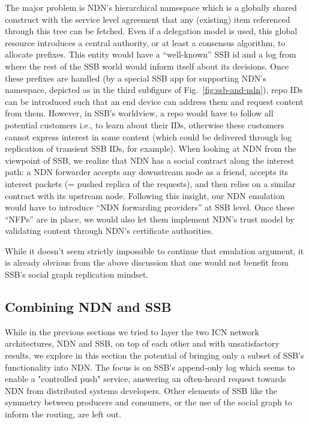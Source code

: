 \documentclass[9pt,sigconf]{acmart}
\begin{document}
The major problem is NDN's hierarchical namespace which is a globally
shared construct with the service level agreement that any (existing)
item referenced through this tree can be fetched.  Even if a
delegation model is used, this global resource introduces a central
authority, or at least a consensus algorithm, to allocate
prefixes. This entity would have a ``well-known'' SSB id and a log
from where the rest of the SSB world would inform itself about its
decisions. Once these prefixes are handled (by a special SSB app for
supporting NDN's namespace, depicted as  in the third subfigure of Fig.~\ref{fig:ssb-and-ndn}), repo IDs
can be introduced such that an end device can address them and request
content from them. However, in SSB's worldview, a repo would have to
follow all potential customers i.e., to learn about their IDs,
otherwise these customers cannot express interest in some content
(which could be delivered through log replication of transient SSB
IDs, for example). When looking at NDN from the viewpoint of SSB,
 we realize that NDN has a social contract along the interest path:
 a NDN forwarder accepts any downstream node as a friend, accepts its interest packets (= pushed
replica of the requests), and then relies on a similar contract with
its upstream node. Following this insight, our NDN emulation would
have to introduce ``NDN forwarding providers'' at SSB level. Once
these ``NFPs'' are in place, we would also let them implement
NDN's trust model by validating content through NDN's certificate
authorities.

While it doesn't seem strictly impossible to continue that emulation
argument, it is already obvious from the above discussion that one
would not benefit from SSB's social graph replication mindset.


\subsection{Combining NDN and SSB}
\label{ssect:combining}


While in the previous sections we tried to layer the two ICN network
architectures, NDN and SSB, on top of each other and with
unsatisfactory results, we explore in this section the potential of
bringing only a subset of SSB's functionality into NDN. The focus is
on SSB's append-only log which seems to enable a "controlled push"
service, answering an often-heard request towards NDN from
distributed systems developers. Other elements of SSB like the
symmetry between producers and consumers, or the use of the social
graph to inform the routing, are left out.
\end{document}
